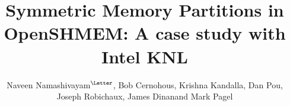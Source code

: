 \documentclass[runningheads,a4paper]{llncs}
\begin{document}
\mainmatter
\title{Symmetric Memory Partitions in OpenSHMEM: A case study with Intel KNL}
\author{Naveen Namashivayam\affmark[1]$^{\textrm{\Letter}}$,
        Bob Cernohous\affmark[1],
        Krishna Kandalla\affmark[1],
        Dan Pou\affmark[1],
        Joseph Robichaux\affmark[2],
        James Dinan\affmark[2]
        and Mark Pagel\affmark[1]}


\maketitle
\begin{abstract}

\end{abstract}














\end{document}
